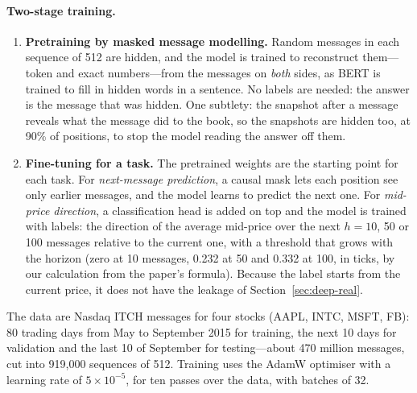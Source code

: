 \paragraph{Two-stage training.}
\begin{enumerate}[leftmargin=1.8em,itemsep=2pt]
\item \textbf{Pretraining by masked message modelling.} Random messages in each sequence of 512 are hidden, and the
  model is trained to reconstruct them---token and exact numbers---from the messages on \emph{both} sides, as BERT is
  trained to fill in hidden words in a sentence. No labels are needed: the answer is the message that was hidden. One
  subtlety: the snapshot after a message reveals what the message did to the book, so the snapshots are hidden too,
  at 90\% of positions, to stop the model reading the answer off them.
\item \textbf{Fine-tuning for a task.} The pretrained weights are the starting point for each task. For
  \emph{next-message prediction}, a causal mask lets each position see only earlier messages, and the model learns to
  predict the next one. For \emph{mid-price direction}, a classification head is added on top and the model is trained
  with labels: the direction of the average mid-price over the next $h = 10$, 50 or 100 messages relative to the
  current one, with a threshold that grows with the horizon (zero at 10 messages, 0.232 at 50 and 0.332 at 100, in
  ticks, by our calculation from the paper's formula). Because the label starts from the current price, it does not
  have the leakage of Section~\ref{sec:deep-real}.
\end{enumerate}
The data are Nasdaq ITCH messages for four stocks (AAPL, INTC, MSFT, FB): 80 trading days from May to September 2015
for training, the next 10 days for validation and the last 10 of September for testing---about 470 million messages,
cut into 919,000 sequences of 512. Training uses the AdamW optimiser with a learning rate of $5 \times 10^{-5}$, for ten
passes over the data, with batches of 32.

